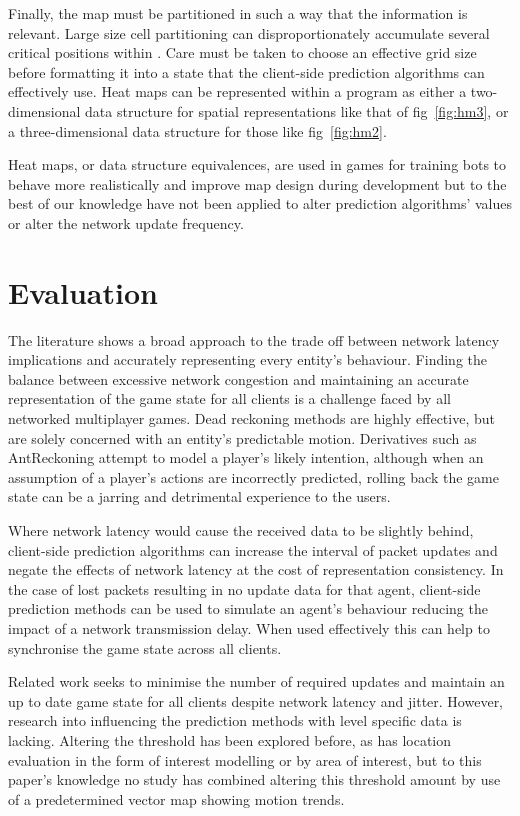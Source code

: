 \documentclass[journal]{IEEEtran}
\begin{document}
Finally, the map must be partitioned in such a way that the information is relevant. Large size cell partitioning can disproportionately accumulate several critical positions within \cite{steed2003partitioning}. Care must be taken to choose an effective grid size before formatting it into a state that the client-side prediction algorithms can effectively use. Heat maps can be represented within a program as either a two-dimensional data structure for spatial representations like that of fig~\ref{fig:hm3}, or a three-dimensional data structure for those like fig~\ref{fig:hm2}.

Heat maps, or data structure equivalences, are used in games for training bots to behave more realistically and improve map design during development \cite{bauckhage2014beyond} but to the best of our knowledge have not been applied to alter prediction algorithms' values or alter the network update frequency.

\section{Evaluation} \label{evaluation}

The literature shows a broad approach to the trade off between network latency implications and accurately representing every entity's behaviour. Finding the balance between excessive network congestion and maintaining an accurate representation of the game state for all clients is a challenge faced by all networked multiplayer games. Dead reckoning methods are highly effective, but are solely concerned with an entity's predictable motion. Derivatives such as AntReckoning attempt to model a player's likely intention, although when an assumption of a player's actions are incorrectly predicted, rolling back the game state can be a jarring and detrimental experience to the users.

Where network latency would cause the received data to be slightly behind, client-side prediction algorithms can increase the interval of packet updates and negate the effects of network latency at the cost of representation consistency. In the case of lost packets resulting in no update data for that agent, client-side prediction methods can be used to simulate an agent's behaviour reducing the impact of a network transmission delay. When used effectively this can help to synchronise the game state across all clients.

Related work seeks to minimise the number of required updates and maintain an up to date game state for all clients despite network latency and jitter. However, research into influencing the prediction methods with level specific data is lacking. Altering the threshold has been explored before, as has location evaluation in the form of interest modelling or by area of interest, but to this paper's knowledge no study has combined altering this threshold amount by use of a predetermined vector map showing motion trends.
\end{document}
